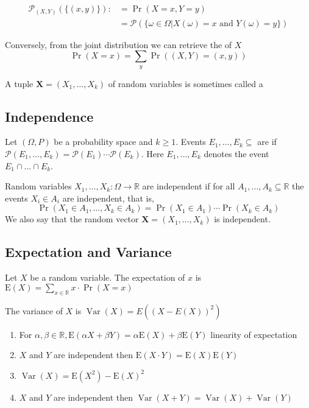 \begin{equation*}
\begin{aligned} 
\mathcal{P}_{(X, Y)}(\{(x, y)\}):&=\operatorname{Pr}(X=x, Y=y) \\ 
&=\mathcal{P}(\{\omega \in \Omega | X(\omega)=x \text { and } Y(\omega)=y\}) \end{aligned}
\end{equation*}

Conversely, from the joint distribution we can retrieve the  of $X$
\begin{equation*}
\operatorname{Pr}(X=x)=\sum_{y} \operatorname{Pr}((X, Y)=(x, y))
\end{equation*}

A tuple $\mathbf{X} = (X_1,\ldots,X_k)$ of random variables is sometimes called a 

\subsection{Independence}
Let $(\Omega,P)$ be a probability space and $k \geq 1$. Events $E_1,\ldots,E_k \subseteq$ are  if $\mathcal{P}\left(E_{1}, \ldots, E_{k}\right)=\mathcal{P}\left(E_{1}\right) \cdots \mathcal{P}\left(E_{k}\right)$. Here $E_1,\ldots,E_k$ denotes the event $E_{1} \cap \ldots \cap E_{k}$.

Random variables $X_1, \ldots, X_k : \Omega \rightarrow \mathbb{R}$ are independent if for all $A_{1}, \ldots, A_{k} \subseteq \mathbb{R}$ the events $X_i \in A_i $ are independent, that is, 
\begin{equation*}
\operatorname{Pr}(X_1 \in A_{1}, \ldots, X_k \in A_k)=\operatorname{Pr}(X_1 \in A_1) \cdots \operatorname{Pr}(X_k \in A_k)
\end{equation*} We also say that the random vector $ \mathbf{X}=(X_1, \ldots, X_k) $ is independent. 

\subsection{Expectation and Variance}
Let $X$ be a random variable. 
The expectation of $x$ is $\mathrm{E}(X)=\sum_{x \in \mathbb{R}} x \cdot \operatorname{Pr}(X=x)$

The variance of $X$ is $\operatorname{Var}(X)=E((X-E(X))^{2})$

\begin{enumerate}
	\item For $\alpha, \beta \in \mathbb{R}, \mathrm{E}(\alpha X+\beta Y)=\alpha \mathrm{E}(X)+\beta \mathrm{E}(Y)$ linearity of expectation
	\item $X$ and $Y$ are independent then $\mathrm{E}(X \cdot Y)=\mathrm{E}(X) \mathrm{E}(Y)$
	\item $\operatorname{Var}(X)=\mathrm{E}\left(X^{2}\right)-\mathrm{E}(X)^{2}$
	\item $X$ and $Y$ are independent then $\operatorname{Var}(X+Y)=\operatorname{Var}(X)+\operatorname{Var}(Y)$
\end{enumerate}

